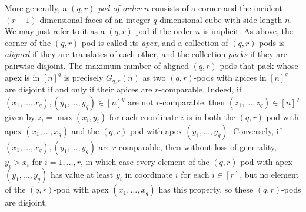 \documentclass[11pt,reqno]{amsart}
\theoremstyle{definition}
\newcommand\1{\mathbf{1}}
\begin{document}
More generally, a {\it $(q,r)$-pod of order $n$} consists of a corner and the incident $(r-1)$-dimensional faces of an integer $q$-dimensional cube with side length $n$. We may just refer to it as a $(q,r)$-pod if the order $n$ is implicit. As above, the corner of the $(q,r)$-pod is called its \textit{apex}, and a collection of $(q,r)$-pods is \textit{aligned} if they are translates of each other, and the collection \textit{packs} if they are pairwise disjoint. The maximum number of aligned $(q,r)$-pods that pack whose apex is in $[n]^q$ is precisely $G_{q,r}(n)$ as two $(q,r)$-pods with apices in $[n]^q$ are disjoint if and only if their apices are $r$-comparable. Indeed, if $(x_1,\ldots,x_q),(y_1,\ldots,y_q) \in [n]^q$ are not $r$-comparable, then $(z_1,\ldots,z_q) \in [n]^q$ given by $z_i=\max(x_i,y_i)$ for each coordinate $i$ is in both the $(q,r)$-pod with apex $(x_1,\ldots,x_q)$ and the $(q,r)$-pod with apex $(y_1,\ldots,y_q)$. Conversely, if $(x_1,\ldots,x_q),(y_1,\ldots,y_q)$ are $r$-comparable, then  without loss of generality, $y_i>x_i$ for $i=1,\ldots,r$, in which case every element of the $(q,r)$-pod with apex $(y_1,\ldots,y_q)$ has value at least $y_i$ in coordinate $i$ for each $i \in [r]$, but no element of the $(q,r)$-pod with apex $(x_1,\ldots,x_q)$ has this property, so these $(q,r)$-pods are disjoint. 
\end{document}
